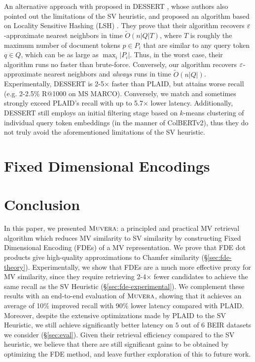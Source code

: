 \documentclass{article}
\newcommand{\name}{\textsc{Muvera}}
\begin{document}
An alternative approach with proposed in DESSERT \cite{engels2024dessert}, whose authors also pointed out the limitations of the SV heuristic, and proposed an algorithm based on Locality Sensitive Hashing (LSH) \cite{HIM12}. 
They prove that their algorithm recovers $\varepsilon$-approximate nearest neighbors in time $\tilde{O}(n |Q| T  )$, where $T$ is roughly the maximum number of document tokens $p \in P_i$ that are similar to any query token $q \in Q$, which can be as large as $\max_i |P_i|$. Thus, in the worst case, their algorithm runs no faster than brute-force. Conversely, our algorithm recovers $\varepsilon$-approximate nearest neighbors and \emph{always} runs in time $\tilde{O}(n|Q|)$. Experimentally, DESSERT is 2-5$\times$ faster than PLAID, but attains worse recall (e.g. 2-2.5$\%$ R$@$1000 on MS MARCO). Conversely, we match and sometimes strongly exceed PLAID's recall with up to 5.7$\times$ lower latency. Additionally, DESSERT still employs an initial filtering stage based on $k$-means clustering of individual query token embeddings (in the manner of ColBERTv2), thus they do not truly avoid the aforementioned limitations of the SV heuristic.





\section{Fixed Dimensional Encodings}
\label{sec:fde}







\section{Conclusion} \label{sec:conclusion}

In this paper, we presented $\name$: a principled and practical MV retrieval algorithm which reduces MV similarity to SV similarity by constructing Fixed Dimensional Encoding (FDEs) of a MV representation. 
We prove that FDE dot products give high-quality approximations to Chamfer similarity (§\ref{sec:fde-theory}). Experimentally, we show that FDEs are a much more effective proxy for MV similarity, since they require retrieving 2-4$\times$ fewer candidates to achieve the same recall as the SV Heuristic (§\ref{sec:fde-experimental}). 
We complement these results with an end-to-end evaluation of $\name$, 
showing that it achieves an average of 10\% improved recall with 90\% lower latency compared with PLAID.
Moreover, despite the extensive optimizations made by PLAID  to the SV Heuristic, we still achieve significantly better latency on $5$ out of $6$ BEIR datasets we consider (§\ref{sec:eval}). 
Given their retrieval efficiency compared to the SV heuristic, we believe that there are still significant gains to be obtained by optimizing the FDE method, and leave further exploration of this to future work.  
\end{document}
